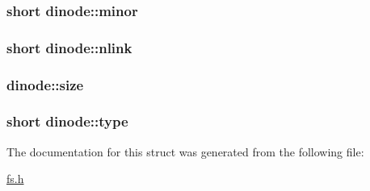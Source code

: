 \subsubsection[{\texorpdfstring{minor}{minor}}]{\setlength{\rightskip}{0pt plus 5cm}short dinode\+::minor}\hypertarget{structdinode_ae97965f85e7353313f85035e8fc63495}{}\label{structdinode_ae97965f85e7353313f85035e8fc63495}
\subsubsection[{\texorpdfstring{nlink}{nlink}}]{\setlength{\rightskip}{0pt plus 5cm}short dinode\+::nlink}\hypertarget{structdinode_a105562253b461c11413c9a229ef15358}{}\label{structdinode_a105562253b461c11413c9a229ef15358}
\subsubsection[{\texorpdfstring{size}{size}}]{ dinode\+::size}\hypertarget{structdinode_a990ad8ddf5f8c051fbbe95cf550d2164}{}\label{structdinode_a990ad8ddf5f8c051fbbe95cf550d2164}
\subsubsection[{\texorpdfstring{type}{type}}]{\setlength{\rightskip}{0pt plus 5cm}short dinode\+::type}\hypertarget{structdinode_abf6b2a8476a803284f1c927fb3b82259}{}\label{structdinode_abf6b2a8476a803284f1c927fb3b82259}


The documentation for this struct was generated from the following file\+:\begin{DoxyCompactItemize}
\item 
\hyperlink{fs_8h}{fs.\+h}\end{DoxyCompactItemize}
